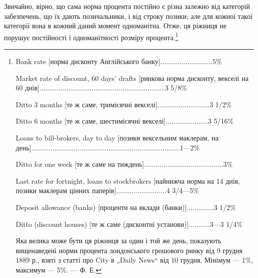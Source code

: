 Звичайно, вірно, що сама норма процента постійно є різна
залежно від категорій забезпечень, що їх дають позичальники,
і від строку позики; але для кожної такої категорії вона
в кожний даний момент одноманітна. Отже, ця ріжниця не порушує
постійності і одноманітності розміру процента.\footnote{
Bank rate [норма дисконту Англійського банку]...........................5\%

Market rate of discount, 60 days’ drafts [ринкова норма дисконту,
векселі на 60 днів].................................................................3 5/8\%

Ditto 3 months [те ж саме, тримісячні векселі]...........................3 1/2\%

Ditto 6 months [те ж саме, шестимісячні векселі]......................3 5/16\%

Loans to bill-brokers, day to day [позики вексельним
маклерам, на день].............................................................................1—2\%

Ditto for one week [те ж саме на тиждень].........................................3\%

Last rate for fortnight, loans to stockbrokers [найнижча норма
на 14 днів, позики маклерам цінних паперів]..........................4 3/4—5\%

Deposit allowance (banks) [проценти на вклади (банки)]..............3 1/2\%

Ditto (discount houses) [те ж саме (дисконтні установи)]...........3—3 1/4\%

Яка велика може бути ця ріжниця за один і той же день, показують вищенаведені
норми процента лондонського грошового ринку від 9 грудня 1889 р.,
взяті з статті про City в „Daily News“ від 10 грудня, Мінімум — 1\%, максимум
— 5\%. — Ф. Е.
}

